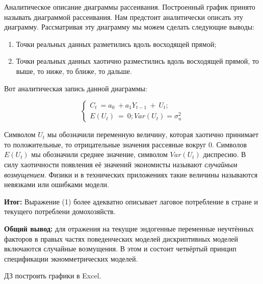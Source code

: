 \documentclass[12pt,a4paper]{article}
\begin{document}
	Аналитическое описание диаграммы рассеивания. Построенный график принято называть диаграммой рассеивания. Нам предстоит аналитически описать эту диаграмму. Рассматривая эту диаграмму мы можем сделать следующие выводы:
\begin{enumerate}
\item Точки реальных данных разметились вдоль восходящей прямой;
\item Точки реальных данных хаотично разместились вдоль восходящей прямой, то выше, то ниже, то ближе, то дальше.
\end{enumerate}

	Вот аналитическая запись данной диаграммы:
	
\begin{equation}
\begin{cases}
C_{t} \ =a_{0} \ +a_{1} Y_{t-1} \ +\ U_{t} ;\\
E( U_{t}) \ =\ 0;Var( U_{t}) = \sigma^{2}_{u}
\end{cases}
\end{equation}

	Символом $\displaystyle U_{t}$ мы обозначили переменную величину, которая хаотично принимает то положительные, то отрицательные значения рассеяные вокруг 0. Символов $\displaystyle E( U_{t})$ мы обозначили среднее значение, символом $\displaystyle Var( U_{t})$ диспресию. В силу хаотичности появления её значений экономисты называют \textit{случайным возмущением}. Физики и в технических приложениях такие величины называются невязками или ошибками модели.

\textbf{Итог: }Выражение (1) более адекватно описывает лаговое потребление в стране и текущего потреблени домохозяйств.

	\textbf{Общий вывод:} для отражения на текущие эндогенные переменные неучтённых факторов в правых частях поведенческих моделей дискриптивных моделей включаются случайные возмущения. В этом и состоит четвёртый принцип спецификации экномметрических моделей.

	$\displaystyle \boxed{\text{ДЗ}}$ построить графики в Excel.
\end{document}

